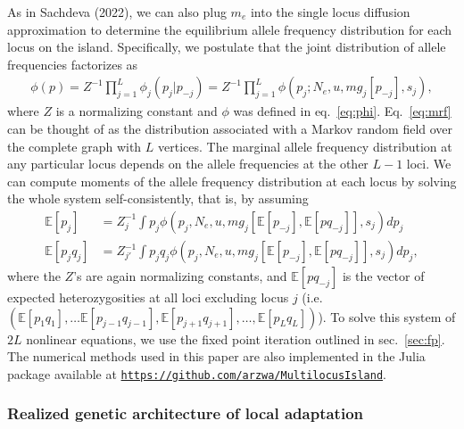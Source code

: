 \documentclass[
  11pt,
]{article}
\begin{document}
As in Sachdeva (2022), we can also plug \(m_e\) into the single locus
diffusion approximation to determine the equilibrium allele frequency
distribution for each locus on the island. Specifically, we postulate
that the joint distribution of allele frequencies factorizes as
\begin{align}
  \phi(p) = Z^{-1} \prod_{j=1}^L \phi_j(p_j|p_{-j}) = 
    Z^{-1}\prod_{j=1}^L \phi(p_j; N_e, u, mg_j[p_{-j}], s_j),
  \label{eq:mrf}
\end{align} where \(Z\) is a normalizing constant and \(\phi\) was
defined in eq.~\ref{eq:phi}. Eq.~\ref{eq:mrf} can be thought of as the
distribution associated with a Markov random field over the complete
graph with \(L\) vertices. The marginal allele frequency distribution at
any particular locus depends on the allele frequencies at the other
\(L-1\) loci. We can compute moments of the allele frequency
distribution at each locus by solving the whole system
self-consistently, that is, by assuming \begin{align*}
  \mathbb{E}[p_j] &= Z_j^{-1}\int p_j \phi(p_j, N_e, u, mg_j[\mathbb{E}[p_{-j}],
      \mathbb{E}[pq_{-j}]],s_j) dp_j \\
  \mathbb{E}[p_jq_j] &= Z_{j'}^{-1}\int p_j q_j \phi(p_j, N_e, u, mg_j\left[\mathbb{E}[p_{-j}],
      \mathbb{E}[pq_{-j}]\right], s_j) dp_j,
\end{align*} where the \(Z\)'s are again normalizing constants, and
\(\mathbb{E}[pq_{-j}]\) is the vector of expected heterozygosities at
all loci excluding locus \(j\) (i.e.
\((\mathbb{E}[p_1q_1], \dots \mathbb{E}[p_{j-1}q_{j-1}], \mathbb{E}[p_{j+1}q_{j+1}], \dots, \mathbb{E}[p_Lq_L])\)).
To solve this system of \(2L\) nonlinear equations, we use the fixed
point iteration outlined in sec.~\ref{sec:fp}. The numerical methods
used in this paper are also implemented in the Julia package available
at
\href{https://github.com/arzwa/MultilocusIsland}{\texttt{https://github.com/arzwa/MultilocusIsland}}.

\hypertarget{realized-genetic-architecture-of-local-adaptation}{%
\subsubsection{Realized genetic architecture of local
adaptation}\label{realized-genetic-architecture-of-local-adaptation}}
\end{document}
